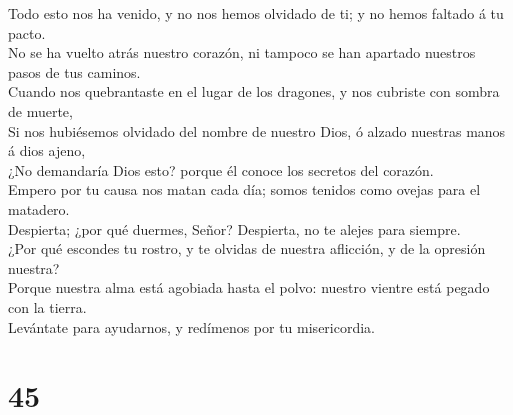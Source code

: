  Todo esto nos ha venido, y no nos hemos olvidado de ti; y
no hemos faltado á tu pacto.\\
 No se ha vuelto atrás nuestro corazón, ni tampoco se han
apartado nuestros pasos de tus caminos.\\
 Cuando nos quebrantaste en el lugar de los dragones, y nos
cubriste con sombra de muerte,\\
 Si nos hubiésemos olvidado del nombre de nuestro Dios, ó
alzado nuestras manos á dios ajeno,\\
 ¿No demandaría Dios esto? porque él conoce los secretos
del corazón.\\
 Empero por tu causa nos matan cada día; somos tenidos como
ovejas para el matadero.\\
 Despierta; ¿por qué duermes, Señor? Despierta, no te
alejes para siempre.\\
 ¿Por qué escondes tu rostro, y te olvidas de nuestra
aflicción, y de la opresión nuestra?\\
 Porque nuestra alma está agobiada hasta el polvo: nuestro
vientre está pegado con la tierra.\\
 Levántate para ayudarnos, y redímenos por tu misericordia.

\hypertarget{section-44}{%
\section{45}\label{section-44}}

